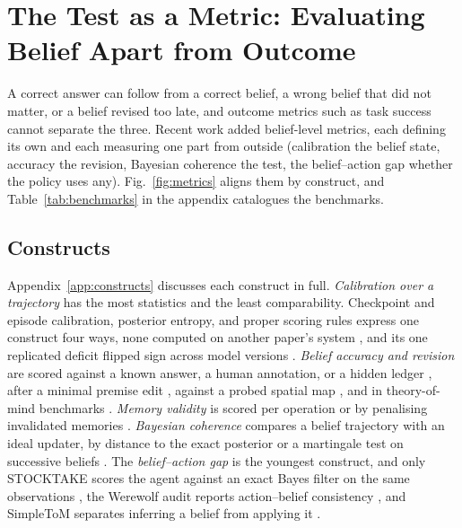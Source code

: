 \section{The Test as a Metric: Evaluating Belief Apart from Outcome}
\label{sec:evaluation}
\ifnature\else\fi



A correct answer can follow from a correct belief, a wrong belief that did not matter, or a belief revised too late, and outcome metrics such as task success \citep{shridhar2020alfworld,liu2023agentbench,yao2024taubench} cannot separate the three. Recent work added belief-level metrics, each defining its own and each measuring one part from outside (calibration the belief state, accuracy the revision, Bayesian coherence the test, the belief--action gap whether the policy uses any). Fig.~\ref{fig:metrics} aligns them by construct, and Table~\ref{tab:benchmarks} in the appendix catalogues the benchmarks.

\subsection{Constructs}
\label{sec:eval:constructs}

\ifnature\else
Appendix~\ref{app:constructs} discusses each construct in full. \emph{Calibration over a trajectory} has the most statistics and the least comparability. Checkpoint and episode calibration, posterior entropy, and proper scoring rules express one construct four ways, none computed on another paper's system \citep{lin2026uncertainty,singh2026agent,dixon2026belief,ye2026forecast}, and its one replicated deficit flipped sign across model versions \citep{joshi2026replication}. \emph{Belief accuracy and revision} are scored against a known answer, a human annotation, or a hidden ledger \citep{xu2026should,myakala2026beliefshift,chao2026stale}, after a minimal premise edit \citep{dhanda2026deltalogic,nguyen2026dynamic}, against a probed spatial map \citep{zhang2026theory}, and in theory-of-mind benchmarks \citep{kim2023fantom}. \emph{Memory validity} is scored per operation or by penalising invalidated memories \citep{chen2025halumem,uddin2026recall}. \emph{Bayesian coherence} compares a belief trajectory with an ideal updater, by distance to the exact posterior or a martingale test on successive beliefs \citep{samanta2026bayesbench,he2025martingale}. The \emph{belief--action gap} is the youngest construct, and only STOCKTAKE scores the agent against an exact Bayes filter on the same observations \citep{deb2026stocktake}, the Werewolf audit reports action--belief consistency \citep{gao2026auditing}, and SimpleToM separates inferring a belief from applying it \citep{gu2024simpletom}.
\fi

